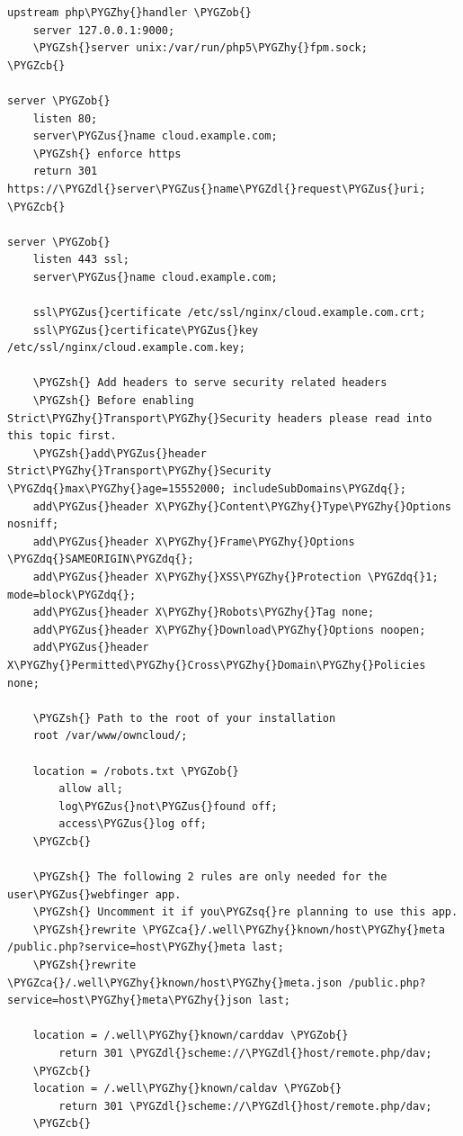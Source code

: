 \documentclass[letterpaper,10pt,english]{sphinxmanual}
\def\PYGZus{\char`\_}
\def\PYGZob{\char`\{}
\def\PYGZcb{\char`\}}
\def\PYGZca{\char`\^}
\def\PYGZsh{\char`\#}
\def\PYGZdl{\char`\$}
\def\PYGZhy{\char`\-}
\def\PYGZsq{\char`\'}
\def\PYGZdq{\char`\"}
\begin{document}
\begin{Verbatim}[commandchars=\\\{\}]
upstream php\PYGZhy{}handler \PYGZob{}
    server 127.0.0.1:9000;
    \PYGZsh{}server unix:/var/run/php5\PYGZhy{}fpm.sock;
\PYGZcb{}

server \PYGZob{}
    listen 80;
    server\PYGZus{}name cloud.example.com;
    \PYGZsh{} enforce https
    return 301 https://\PYGZdl{}server\PYGZus{}name\PYGZdl{}request\PYGZus{}uri;
\PYGZcb{}

server \PYGZob{}
    listen 443 ssl;
    server\PYGZus{}name cloud.example.com;

    ssl\PYGZus{}certificate /etc/ssl/nginx/cloud.example.com.crt;
    ssl\PYGZus{}certificate\PYGZus{}key /etc/ssl/nginx/cloud.example.com.key;

    \PYGZsh{} Add headers to serve security related headers
    \PYGZsh{} Before enabling Strict\PYGZhy{}Transport\PYGZhy{}Security headers please read into this topic first.
    \PYGZsh{}add\PYGZus{}header Strict\PYGZhy{}Transport\PYGZhy{}Security \PYGZdq{}max\PYGZhy{}age=15552000; includeSubDomains\PYGZdq{};
    add\PYGZus{}header X\PYGZhy{}Content\PYGZhy{}Type\PYGZhy{}Options nosniff;
    add\PYGZus{}header X\PYGZhy{}Frame\PYGZhy{}Options \PYGZdq{}SAMEORIGIN\PYGZdq{};
    add\PYGZus{}header X\PYGZhy{}XSS\PYGZhy{}Protection \PYGZdq{}1; mode=block\PYGZdq{};
    add\PYGZus{}header X\PYGZhy{}Robots\PYGZhy{}Tag none;
    add\PYGZus{}header X\PYGZhy{}Download\PYGZhy{}Options noopen;
    add\PYGZus{}header X\PYGZhy{}Permitted\PYGZhy{}Cross\PYGZhy{}Domain\PYGZhy{}Policies none;

    \PYGZsh{} Path to the root of your installation
    root /var/www/owncloud/;

    location = /robots.txt \PYGZob{}
        allow all;
        log\PYGZus{}not\PYGZus{}found off;
        access\PYGZus{}log off;
    \PYGZcb{}

    \PYGZsh{} The following 2 rules are only needed for the user\PYGZus{}webfinger app.
    \PYGZsh{} Uncomment it if you\PYGZsq{}re planning to use this app.
    \PYGZsh{}rewrite \PYGZca{}/.well\PYGZhy{}known/host\PYGZhy{}meta /public.php?service=host\PYGZhy{}meta last;
    \PYGZsh{}rewrite \PYGZca{}/.well\PYGZhy{}known/host\PYGZhy{}meta.json /public.php?service=host\PYGZhy{}meta\PYGZhy{}json last;

    location = /.well\PYGZhy{}known/carddav \PYGZob{}
        return 301 \PYGZdl{}scheme://\PYGZdl{}host/remote.php/dav;
    \PYGZcb{}
    location = /.well\PYGZhy{}known/caldav \PYGZob{}
        return 301 \PYGZdl{}scheme://\PYGZdl{}host/remote.php/dav;
    \PYGZcb{}


\end{Verbatim}
\end{document}

